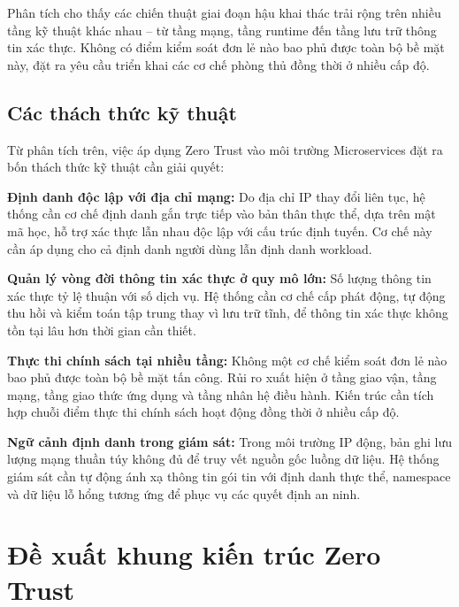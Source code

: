 Phân tích cho thấy các chiến thuật giai đoạn hậu khai thác trải rộng trên nhiều tầng kỹ thuật khác nhau -- từ tầng mạng, tầng runtime đến tầng lưu trữ thông tin xác thực. Không có điểm kiểm soát đơn lẻ nào bao phủ được toàn bộ bề mặt này, đặt ra yêu cầu triển khai các cơ chế phòng thủ đồng thời ở nhiều cấp độ.

\subsection{Các thách thức kỹ thuật}

Từ phân tích trên, việc áp dụng Zero Trust vào môi trường Microservices đặt ra bốn thách thức kỹ thuật cần giải quyết:

\textbf{Định danh độc lập với địa chỉ mạng:}
Do địa chỉ IP thay đổi liên tục, hệ thống cần cơ chế định danh gắn trực tiếp vào bản thân thực thể, dựa trên mật mã học, hỗ trợ xác thực lẫn nhau độc lập với cấu trúc định tuyến. Cơ chế này cần áp dụng cho cả định danh người dùng lẫn định danh workload.

\textbf{Quản lý vòng đời thông tin xác thực ở quy mô lớn:}
Số lượng thông tin xác thực tỷ lệ thuận với số dịch vụ. Hệ thống cần cơ chế cấp phát động, tự động thu hồi và kiểm toán tập trung thay vì lưu trữ tĩnh, để thông tin xác thực không tồn tại lâu hơn thời gian cần thiết.

\textbf{Thực thi chính sách tại nhiều tầng:}
Không một cơ chế kiểm soát đơn lẻ nào bao phủ được toàn bộ bề mặt tấn công. Rủi ro xuất hiện ở tầng giao vận, tầng mạng, tầng giao thức ứng dụng và tầng nhân hệ điều hành. Kiến trúc cần tích hợp chuỗi điểm thực thi chính sách hoạt động đồng thời ở nhiều cấp độ.

\textbf{Ngữ cảnh định danh trong giám sát:}
Trong môi trường IP động, bản ghi lưu lượng mạng thuần túy không đủ để truy vết nguồn gốc luồng dữ liệu. Hệ thống giám sát cần tự động ánh xạ thông tin gói tin với định danh thực thể, namespace và dữ liệu lỗ hổng tương ứng để phục vụ các quyết định an ninh.




\section{Đề xuất khung kiến trúc Zero Trust}


